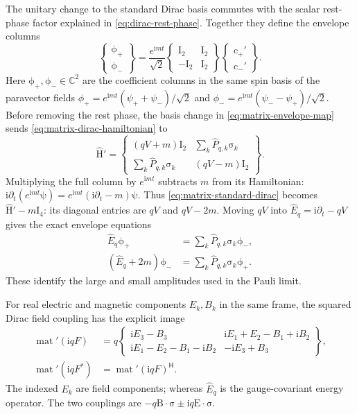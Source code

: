 \documentclass[11pt]{article}
\newcommand{\pv}[1]{{#1}}
\newcommand{\pvGreek}[1]{{#1}}
\newcommand{\vstyle}[1]{{\bm{\mathrm{#1}}}}
\newcommand{\pF}{\pv{F}}
\newcommand{\pvphi}{\pvGreek{\phi}}
\newcommand{\pvpsi}{\pvGreek{\psi}}
\numberwithin{equation}{section}
\newcommand{\C}{\mathbb{C}}
\newcommand{\ii}{\mathrm{i}}
\newcommand{\dotprod}{\cdot}
\newcommand{\bsig}{\vstyle{\sigma}}
\newcommand{\bE}{\vstyle{E}}
\newcommand{\bBf}{\vstyle{B}}
\newcommand{\bI}{\vstyle{I}}
\newcommand{\bpsi}{\vstyle{\psi}}
\newcommand{\hEq}{\hat E_q}
\newcommand{\hH}{\hat{\vstyle{H}}}
\begin{document}
The unitary change to the standard Dirac basis commutes with the scalar
rest-phase factor explained in \eqref{eq:dirac-rest-phase}.
Together they define the envelope columns
\begin{equation}
 \begin{Bmatrix}\vstyle{\phi}_+\\\vstyle{\phi}_-\end{Bmatrix}
 =\frac{e^{\ii mt}}{\sqrt2}
 \begin{Bmatrix}\bI_2&\bI_2\\-\bI_2&\bI_2\end{Bmatrix}
 \begin{Bmatrix}\vstyle{c}_+'\\\vstyle{c}_-'\end{Bmatrix}.
 \label{eq:matrix-envelope-map}
\end{equation}
Here $\vstyle{\phi}_+,\vstyle{\phi}_-\in\C^2$ are the coefficient columns in the same
spin basis of the paravector fields
$\pvphi_+=e^{\ii mt}(\pvpsi_++\pvpsi_-)/\sqrt2$ and
$\pvphi_-=e^{\ii mt}(\pvpsi_--\pvpsi_+)/\sqrt2$.
Before removing the rest phase, the basis change in
\eqref{eq:matrix-envelope-map} sends \eqref{eq:matrix-dirac-hamiltonian} to
\begin{equation}
 \hH'=\begin{Bmatrix}
 (qV+m)\bI_2&\sum_k\hat P_{q,k}\vstyle{\sigma}_k\\
 \sum_k\hat P_{q,k}\vstyle{\sigma}_k&(qV-m)\bI_2
 \end{Bmatrix}.
 \label{eq:matrix-standard-dirac}
\end{equation}
Multiplying the full column by $e^{\ii mt}$ subtracts $m$ from its
Hamiltonian: $\ii\partial_t(e^{\ii mt}\bpsi)=e^{\ii mt}(\ii\partial_t-m)\bpsi$.
Thus \eqref{eq:matrix-standard-dirac} becomes $\hH'-m\bI_4$:
its diagonal entries are $qV$ and $qV-2m$.
Moving $qV$ into $\hEq=\ii\partial_t-qV$ gives the exact envelope equations
\begin{align*}
 \hEq\vstyle{\phi}_+&=\sum_k\hat P_{q,k}\vstyle{\sigma}_k\vstyle{\phi}_-,\\
 (\hEq+2m)\vstyle{\phi}_-&=\sum_k\hat P_{q,k}\vstyle{\sigma}_k\vstyle{\phi}_+.
\end{align*}
These identify the large and small amplitudes used in the Pauli limit.

For real electric and magnetic components $E_k,B_k$ in the same frame,
the squared Dirac field coupling has the explicit image
\begin{align*}
 \operatorname{mat}'(\ii q\pF)
 &=q\begin{Bmatrix}
 \ii E_3-B_3&\ii E_1+E_2-B_1+\ii B_2\\
 \ii E_1-E_2-B_1-\ii B_2&-\ii E_3+B_3
 \end{Bmatrix},
 \\
 \operatorname{mat}'(\ii q\pF^*)&=\operatorname{mat}'(\ii q\pF)^{\mathsf H}.
\end{align*}
The indexed $E_k$ are field components;
whereas $\hEq$ is the gauge-covariant energy operator.
The two couplings are $-q\bBf\dotprod\bsig\pm\ii q\bE\dotprod\bsig$.
\end{document}
